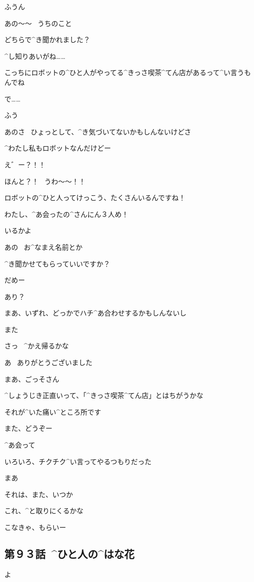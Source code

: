 \R ふうん

\A あの〜〜
\ うちのこと

\A どちらで^{き}{聞}かれました？

\R ^{し}{知}りあいがね……

\R こっちにロボットの^{ひと}{人}がやってる^{きっさ}{喫茶}^{てん}{店}があるって^{い}{言}うもんでね

\page
\R で……

\R ふう

\R あのさ
\ ひょっとして、^{き}{気}づいてないかもしんないけどさ

\R ^{わたし}{私}もロボットなんだけどー

\A え゛ー？！！

\A ほんと？！
\ うわ〜〜！！

\page
\A ロボットの^{ひと}{人}ってけっこう、たくさんいるんですね！

\A わたし、^{あ}{会}ったの^{さんにん}{３人}め！

\R いるかよ

\A あの
\ お^{なまえ}{名前}とか

\A ^{き}{聞}かせてもらっていいですか？

\R だめー

\A あり？

\page
\R まあ、いずれ、どっかでハチ^{あ}{合}わせするかもしんないし

\R また

\R さっ
\ ^{かえ}{帰}るかな

\A あ
\ ありがとうございました

\R まあ、ごっそさん

\R ^{しょうじき}{正直}いって、「^{きっさ}{喫茶}^{てん}{店}」とはちがうかな

\A それが^{いた}{痛}い^{ところ}{所}です

\page
\A また、どうぞー

\R ^{あ}{会}って

\R いろいろ、チクチク^{い}{言}ってやるつもりだった

\page
\R まあ

\R それは、また、いつか

\A これ、^{と}{取}りにくるかな

\A こなきゃ、もらいー


\subsection{第９３話\ ^{ひと}{人}の^{はな}{花}}

\page[73]
\SH よ

